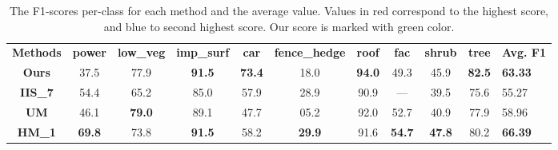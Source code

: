 \documentclass[final,3p,times,twocolumn,authoryear]{elsarticle}
\begin{document}
\begin{table*}[]
\centering
\caption{The F1-scores per-class for each method and the average value. Values in red correspond to the highest score, and blue to second highest score. Our score is marked with green color.}
\label{tab:F1}
\begin{tabular}{c|ccccccccc|l}
                        \textbf{Methods} & \textbf{power}                        & \textbf{low\_veg}                     & \textbf{imp\_surf}                    & \textbf{car}                          & \textbf{fence\_hedge}                 & \textbf{roof}                         & \textbf{fac}                          & \textbf{shrub}                        & \textbf{tree}                         & \textbf{Avg. F1}                       \\ \cline{1-11} 
\multicolumn{1}{c|}{\textbf{Ours}}   & 37.5                                 & 77.9                                 & {\color[HTML]{FE0000} \textbf{91.5}} & {\color[HTML]{FE0000} \textbf{73.4}} & 18.0                                 & {\color[HTML]{3531FF} \textbf{94.0}} & 49.3                                 & 45.9                                 & {\color[HTML]{3531FF} \textbf{82.5}} & {\color[HTML]{009901} \textbf{63.33}} \\
\multicolumn{1}{c|}{\textbf{IIS\_7}} & 54.4                                 & 65.2                                 & 85.0                                 & 57.9                                 & 28.9                                 & 90.9                                 & ---                                   & 39.5                                 & 75.6                                 & 55.27                                 \\
\multicolumn{1}{c|}{\textbf{UM}}     & 46.1                                 & {\color[HTML]{3531FF} \textbf{79.0}} & 89.1                                 & 47.7                                 & 05.2                                 & 92.0                                 & 52.7                                 & 40.9                                 & 77.9                                 & 58.96                                 \\
\multicolumn{1}{c|}{\textbf{HM\_1}}  & {\color[HTML]{FE0000} \textbf{69.8}} & 73.8                                 & {\color[HTML]{FE0000} \textbf{91.5}} & 58.2                                 & {\color[HTML]{3531FF} \textbf{29.9}}                                 & 91.6                                 & {\color[HTML]{3531FF} \textbf{54.7}} & {\color[HTML]{FE0000} \textbf{47.8}} & 80.2                                 & {\color[HTML]{3531FF} \textbf{66.39}} \\

\end{tabular}
\end{table*}
\end{document}

